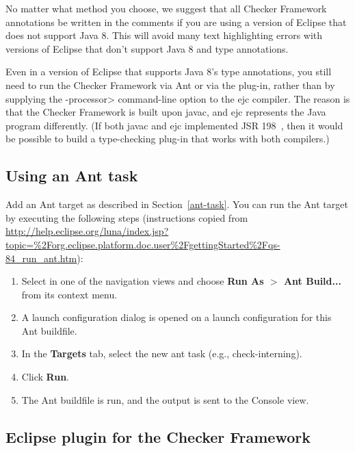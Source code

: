 No matter what method you choose, we suggest that
all Checker Framework annotations be written in the comments
if you are using a version of Eclipse that
does not support Java 8.  This will avoid many
text highlighting errors with versions of Eclipse that don't support Java 8
and type annotations.

Even in a version of Eclipse that supports Java 8's type annotations, you
still need to run the Checker Framework via Ant or via the plug-in, rather
than by supplying the \<-processor> command-line option to the ejc
compiler.  The reason is that the Checker Framework is built upon javac,
and ejc represents the Java program differently.  (If both javac and ejc
implemented JSR 198~\cite{JSR198}, then it would be possible to build
a type-checking plug-in that works with both compilers.)


\subsection{Using an Ant task\label{eclipse-ant}}

Add an Ant target as described in Section~\ref{ant-task}.  You can
run the Ant target by executing the following steps
(instructions copied from {\codesize\url{http://help.eclipse.org/luna/index.jsp?topic=%2Forg.eclipse.platform.doc.user%2FgettingStarted%2Fqs-84_run_ant.htm}}):

\begin{enumerate}

\item
  Select  in one of the navigation views and choose
  {\bf Run As $>$ Ant Build...} from its context menu.

\item
  A launch configuration dialog is opened on a launch configuration
  for this Ant buildfile.

\item
  In the {\bf Targets} tab, select the new ant task (e.g., check-interning).

\item
  Click {\bf Run}.

\item
  The Ant buildfile is run, and the output is sent to the Console view.

\end{enumerate}


\label{eclipse-plug-in}         %
\subsection{Eclipse plugin for the Checker Framework\label{eclipse-plugin}}

